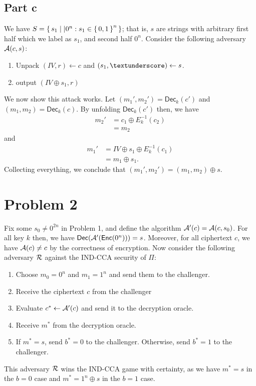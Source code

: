 \documentclass{article}
\theoremstyle{definition}
\begin{document}
\subsection*{Part c}

We have $S=\set{s_1||0^n : s_1\in \set{0, 1}^{n}}$; that is, $s$ are strings with arbitrary first half which we label as $s_1$, and second half $0^n$.
Consider the following adversary $\mathcal{A}(c, s)$: \begin{enumerate}
    \item Unpack $(IV, r)\gets c$ and $(s_1, \textunderscore)\gets s$.
    \item output $(IV\oplus s_1, r)$
\end{enumerate}
We now show this attack works.
Let $(m_1', m_2')=\mathsf{Dec}_k(c')$ and $(m_1, m_2)=\mathsf{Dec}_k(c)$.
By unfolding $\mathsf{Dec}_k(c')$ then, we have
\begin{align*}
    m_2'&=c_1\oplus E_k^{-1}(c_2)\\
    &=m_2
\end{align*}
and
\begin{align*}
    m_1'&=IV\oplus s_1\oplus E_k^{-1}(c_1)\\
    &=m_1\oplus s_1. 
\end{align*}
Collecting everything, we conclude that
$(m_1', m_2')=(m_1, m_2)\oplus s$.

\section*{Problem 2}

Fix some $s_0\ne 0^{2n}$ in Problem 1, and define the algorithm $\mathcal{A}'(c)=\mathcal{A}(c, s_0)$.
For all key $k$ then, we have $\mathsf{Dec}(\mathcal{A}'(\mathsf{Enc}(0^n)))=s$.
Moreover, for all ciphertext $c$, we have $\mathcal{A}(c)\ne c$ by the correctness of encryption.
Now consider the following adversary $\mathcal{R}$ against the IND-CCA security of $\Pi$:
\begin{enumerate}
    \item Choose $m_0=0^n$ and $m_1=1^n$ and send them to the challenger.
    \item Receive the ciphertext $c$ from the challenger
    \item Evaluate $c^*\gets \mathcal{A}'(c)$ and send it to the decryption oracle.
    \item Receive $m^*$ from the decryption oracle.
    \item If $m^*=s$, send $b^*=0$ to the challenger. Otherwise, send $b^*=1$ to the challenger.
\end{enumerate}
This adversary $\mathcal{R}$ wins the IND-CCA game with certainty, as we have $m^*=s$ in the $b=0$ case and $m^*=1^n\oplus s$ in the $b=1$ case.
\end{document}

